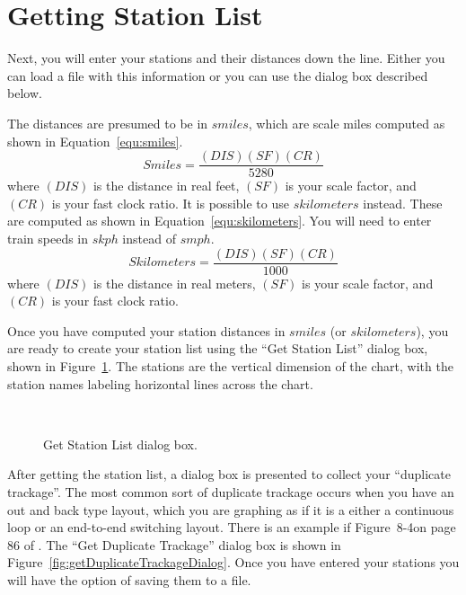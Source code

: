 \section{Getting Station List}
\label{sect:GettingStationList}

Next,  you will enter your stations and their distances down the line.
Either you can load a file with this information or you can use the
dialog box described below. 

The distances are presumed to be in $smiles$, which are scale miles
computed as shown in Equation~\ref{equ:smiles}.
\begin{equation}
Smiles = \frac{(DIS) (SF) (CR)}{5280}
\label{equ:smiles}
\end{equation}
where $(DIS)$ is the distance in real feet, $(SF)$ is your scale factor,
and $(CR)$ is your fast clock ratio.  It is possible to use
$skilometers$ instead.  These are computed as shown in
Equation~\ref{equ:skilometers}.  You will need to enter train speeds in
$skph$ instead of $smph$.
\begin{equation}
Skilometers = \frac{(DIS) (SF) (CR)}{1000}
\label{equ:skilometers}
\end{equation}
where $(DIS)$ is the distance in real meters, $(SF)$ is your scale
factor, and $(CR)$ is your fast clock ratio.

Once you have computed your station distances in $smiles$ (or
$skilometers$), you are ready to create your station list using the
``Get Station List'' dialog box, shown in
Figure~\ref{fig:getStationListDialog}.  The stations are the
vertical dimension of the chart, with the station names labeling
horizontal lines across the chart.  

\begin{figure}
\begin{centering}
\\
\caption{Get Station List dialog box.}
\label{fig:getStationListDialog}
\end{centering}
\end{figure}   

After getting the station list, a dialog box is presented to collect
your ``duplicate trackage''. The most common sort of duplicate trackage
occurs when you have an out and back type layout, which you are
graphing as if it is a either a continuous loop or an end-to-end
switching layout.  There is an example if Figure~8-4on page 86 of
\cite{Chubb77}. The ``Get Duplicate Trackage'' dialog box is shown in
Figure~\ref{fig:getDuplicateTrackageDialog}. Once you have entered your
stations you will have the option of saving them to a file.

